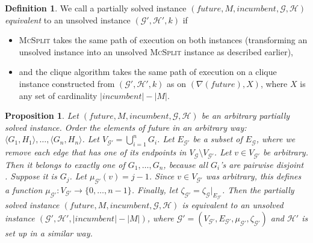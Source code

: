 \documentclass{l4proj}
\newtheorem{proposition}{Proposition}[chapter]
\theoremstyle{definition}
\newtheorem{definition}{Definition}[chapter]
\theoremstyle{remark}
\begin{document}
\begin{definition}
  We call a partially solved instance $(\textit{future}, M, \textit{incumbent},
  \mathcal{G}, \mathcal{H})$ \emph{equivalent} to an unsolved instance
  $(\mathcal{G'}, \mathcal{H'}, k)$ if
  \begin{itemize}
  \item \textsc{McSplit} takes the same path of execution on both instances
    (transforming an unsolved instance into an unsolved \textsc{McSplit}
    instance as described earlier),
  \item and the clique algorithm takes the same path of execution on a clique
    instance constructed from $(\mathcal{G'}, \mathcal{H'}, k)$ as on
    $(\nabla(\textit{future}), X)$, where $X$ is any set of cardinality
    $|\textit{incumbent}| - |M|$.
  \end{itemize}
\end{definition}

\begin{proposition}
  Let $(\textit{future}, M, \textit{incumbent}, \mathcal{G},
  \mathcal{H})$ be an arbitrary partially solved instance. Order the
  elements of \textit{future} in an arbitrary way: $\langle G_1, H_1 \rangle,
  \dots, \langle G_n, H_n \rangle$. Let $V_{\mathcal{G'}} = \bigcup_{i=1}^n
  G_i$. Let $E_{\mathcal{G'}}$ be a subset of $E_{\mathcal{G}}$, where we remove
  each edge that has one of its endpoints in $V_{\mathcal{G}} \setminus
  V_{\mathcal{G'}}$. Let $v \in V_{\mathcal{G'}}$ be arbitrary. Then it belongs
  to exactly one of $G_1, \dots, G_n$, because all $G_i$'s are pairwise disjoint
  \cite{DBLP:conf/ijcai/McCreeshPT17}. Suppose it is $G_j$. Let
  $\mu_{\mathcal{G'}}(v) = j - 1$. Since $v \in V_{\mathcal{G'}}$ was arbitrary,
  this defines a function $\mu_{\mathcal{G'}} \colon V_{\mathcal{G'}} \to \{ 0,
  \dots, n - 1 \}$. Finally, let $\zeta_{\mathcal{G'}} =
  \zeta_{\mathcal{G}}|_{E_{\mathcal{G'}}}$. Then the partially solved instance
  $(\textit{future}, M, \textit{incumbent}, \mathcal{G}, \mathcal{H})$ is
  equivalent to an unsolved instance $(\mathcal{G'}, \mathcal{H'},
  |\textit{incumbent}| - |M|)$, where $\mathcal{G'} = (V_{\mathcal{G'}},
  E_{\mathcal{G'}}, \mu_{\mathcal{G'}}, \zeta_{\mathcal{G'}})$ and
  $\mathcal{H'}$ is set up in a similar way.
\end{proposition}
\end{document}
